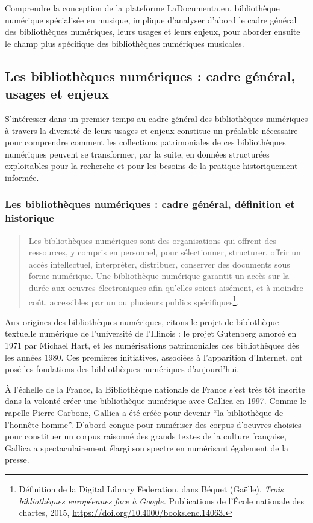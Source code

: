 Comprendre la conception de la plateforme LaDocumenta.eu, bibliothèque numérique spécialisée en musique, implique d'analyser d'abord le cadre général des bibliothèques numériques, leurs usages et leurs enjeux, pour aborder ensuite le champ plus spécifique des bibliothèques numériques musicales.

\subsection*{Les bibliothèques numériques : cadre général, usages et enjeux}

S'intéresser dans un premier temps au cadre général des bibliothèques numériques à travers la diversité de leurs usages et enjeux constitue un préalable nécessaire pour comprendre comment les collections patrimoniales de ces bibliothèques numériques peuvent se transformer, par la suite, en données structurées exploitables pour la recherche et pour les besoins de la pratique historiquement informée.

\subsubsection*{Les bibliothèques numériques : cadre général, définition et historique}

\begin{quotation}
	Les bibliothèques numériques sont des organisations qui offrent des ressources, y compris en personnel, pour sélectionner, structurer, offrir un accès intellectuel, interpréter, distribuer, conserver des documents sous forme numérique. Une bibliothèque numérique garantit un accès sur la durée aux oeuvres électroniques afin qu'elles soient aisément, et à moindre coût, accessibles par un ou plusieurs publics spécifiques\footnote{Définition de la Digital Library Federation, dans Béquet (Gaëlle), \textit{Trois bibliothèques européennes face à Google.} Publications de l’École nationale des chartes, 2015, \url{https://doi.org/10.4000/books.enc.14063.}}.
\end{quotation}

Aux origines des bibliothèques numériques, citons le projet de biblothèque textuelle numérique de l'université de l'Illinois : le projet Gutenberg amorcé en 1971 par Michael Hart, et les numérisations patrimoniales des bibliothèques dès les années 1980. Ces premières initiatives, associées à l'apparition d'Internet, ont posé les fondations des bibliothèques numériques d'aujourd'hui. 

À l'échelle de la France, la Bibliothèque nationale de France s'est très tôt inscrite dans la volonté créer une bibliothèque numérique avec Gallica en 1997. Comme le rapelle Pierre Carbone, Gallica a été créée pour devenir \enquote{la bibliothèque de l'honnête homme}. D'abord conçue pour numériser des corpus d'oeuvres choisies pour constituer un corpus raisonné des grands textes de la culture française, Gallica a spectaculairement élargi son spectre en numérisant également de la presse. 

